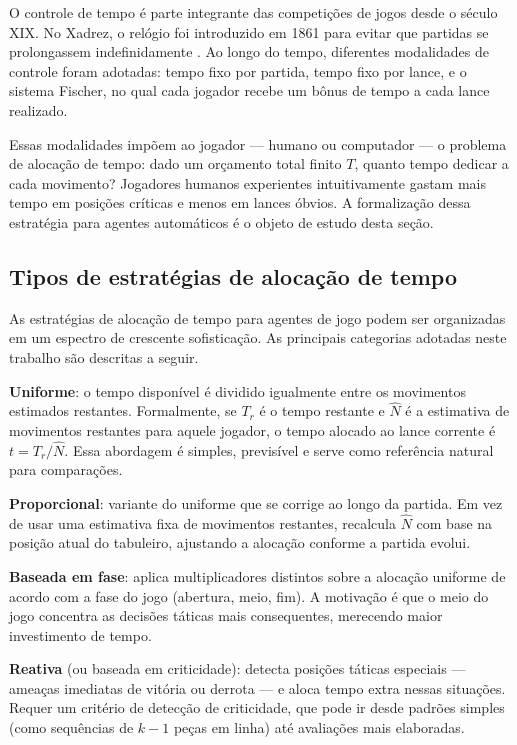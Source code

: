 \documentclass[cic,tc]{iiufrgs}
\begin{document}
O controle de tempo é parte integrante das competições de jogos desde o século XIX. No Xadrez, o relógio foi introduzido em 1861 para evitar que partidas se prolongassem indefinidamente \cite{shannon1950programming}. Ao longo do tempo, diferentes modalidades de controle foram adotadas: tempo fixo por partida, tempo fixo por lance, e o sistema Fischer, no qual cada jogador recebe um bônus de tempo a cada lance realizado.

Essas modalidades impõem ao jogador — humano ou computador — o problema de alocação de tempo: dado um orçamento total finito $T$, quanto tempo dedicar a cada movimento? Jogadores humanos experientes intuitivamente gastam mais tempo em posições críticas e menos em lances óbvios. A formalização dessa estratégia para agentes automáticos é o objeto de estudo desta seção.

\subsection{Tipos de estratégias de alocação de tempo}
\label{sec:timealloc_types}

As estratégias de alocação de tempo para agentes de jogo podem ser organizadas em um espectro de crescente sofisticação. As principais categorias adotadas neste trabalho são descritas a seguir.

\textbf{Uniforme}: o tempo disponível é dividido igualmente entre os movimentos estimados restantes. Formalmente, se $T_r$ é o tempo restante e $\hat{N}$ é a estimativa de movimentos restantes para aquele jogador, o tempo alocado ao lance corrente é $t = T_r / \hat{N}$. Essa abordagem é simples, previsível e serve como referência natural para comparações.

\textbf{Proporcional}: variante do uniforme que se corrige ao longo da partida. Em vez de usar uma estimativa fixa de movimentos restantes, recalcula $\hat{N}$ com base na posição atual do tabuleiro, ajustando a alocação conforme a partida evolui.

\textbf{Baseada em fase}: aplica multiplicadores distintos sobre a alocação uniforme de acordo com a fase do jogo (abertura, meio, fim). A motivação é que o meio do jogo concentra as decisões táticas mais consequentes, merecendo maior investimento de tempo.

\textbf{Reativa} (ou baseada em criticidade): detecta posições táticas especiais — ameaças imediatas de vitória ou derrota — e aloca tempo extra nessas situações. Requer um critério de detecção de criticidade, que pode ir desde padrões simples (como sequências de $k-1$ peças em linha) até avaliações mais elaboradas.
\end{document}
